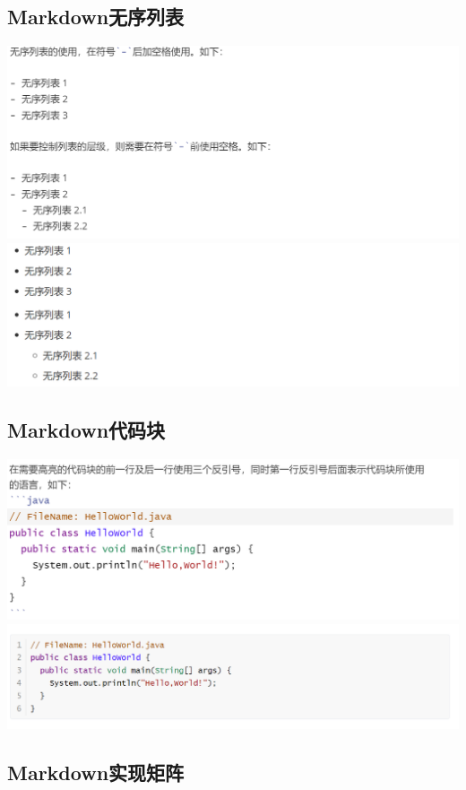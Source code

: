 \documentclass[UTF8,a4paper]{ctexart}
\begin{document}
\begin{sloppypar}
	\subsection{Markdown无序列表}

	\includegraphics[width = 16cm]{71}
	\includegraphics[width = 16cm]{72}
	
	\subsection{Markdown代码块}

	\includegraphics[width = 16cm]{81}
	\includegraphics[width = 16cm]{82}
	
	\subsection{Markdown实现矩阵}


\end{sloppypar}
\end{document}

